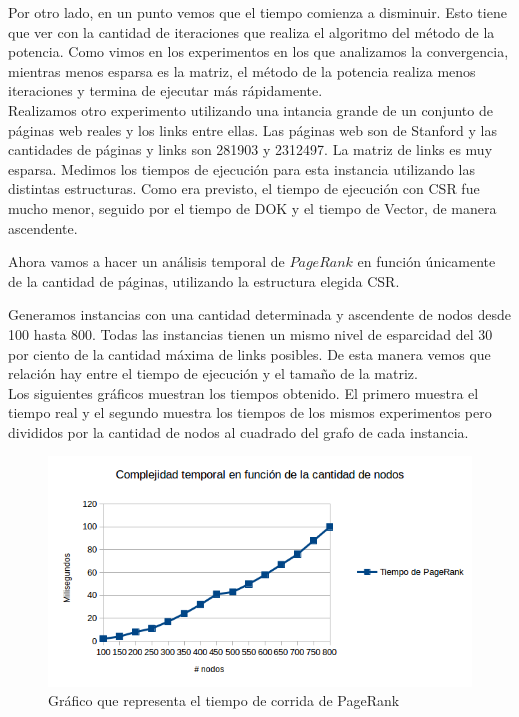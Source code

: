 Por otro lado, en un punto vemos que el tiempo comienza a disminuir. Esto tiene que ver con la cantidad de iteraciones que realiza el algoritmo del método de la potencia. Como vimos en los experimentos en los que analizamos la convergencia, mientras menos esparsa es la matriz, el método de la potencia realiza menos iteraciones y termina de ejecutar más rápidamente. \\

Realizamos otro experimento utilizando una intancia grande de un conjunto de páginas web reales y los links entre ellas. Las páginas web son de Stanford y las cantidades de páginas y links son 281903 y 2312497. La matriz de links es muy esparsa. Medimos los tiempos de ejecución para esta instancia utilizando las distintas estructuras. Como era previsto, el tiempo de ejecución con CSR fue mucho menor, seguido por el tiempo de DOK y el tiempo de Vector, de manera ascendente.

Ahora vamos a hacer un análisis temporal de $PageRank$ en función únicamente de la cantidad de páginas, utilizando la estructura elegida CSR.

Generamos instancias con una cantidad determinada y ascendente de nodos desde 100 hasta 800. Todas las instancias tienen un mismo nivel de esparcidad del 30 por ciento de la cantidad máxima de links posibles. De esta manera vemos que relación hay entre el tiempo de ejecución y el tamaño de la matriz. \\

Los siguientes gráficos muestran los tiempos obtenido. El primero muestra el tiempo real y el segundo muestra los tiempos de los mismos experimentos pero divididos por la cantidad de nodos al cuadrado del grafo de cada instancia.\\

\newpage

\begin{figure}[h]
   \begin{center}
    \includegraphics[scale= 0.8]{imagenes/complejidadcuadratica.png}
   \end{center}
   \caption{Gráfico que representa el tiempo de corrida de PageRank}
  \label{fig:cuad}
\end{figure}

